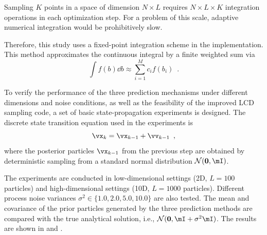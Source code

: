 Sampling $K$ points in a space of dimension $N \times L$ requires $N \times L \times K$ integration operations in each optimization step. For a problem of this scale, adaptive numerical integration would be prohibitively slow.

Therefore, this study uses a fixed-point integration scheme in the implementation. This method approximates the continuous integral by a finite weighted sum via
\begin{equation}
	\int f(b) \dd b \approx \sum_{i=1}^M c_i f(b_i) \enspace .
\end{equation}

To verify the performance of the three prediction mechanisms under different dimensions and noise conditions, as well as the feasibility of the improved LCD sampling code, a set of basic state-propagation experiments is designed. The discrete state transition equation used in the experiments is
\begin{equation}
	\vx_k = \vx_{k-1} + \vv_{k-1} \enspace ,
\end{equation}
where the posterior particles $\vx_{k-1}$ from the previous step are obtained by deterministic sampling from a standard normal distribution $\mathcal{N}(\mathbf{0}, \mI)$.

The experiments are conducted in low-dimensional settings (2D, $L=100$ particles) and high-dimensional settings (10D, $L=1000$ particles). Different process noise variances $\sigma^2 \in \{1.0, 2.0, 5.0, 10.0\}$ are also tested. The mean and covariance of the prior particles generated by the three prediction methods are compared with the true analytical solution, i.e., $\mathcal{N}(\mathbf{0}, \mI + \sigma^2\mI)$. The results are shown in  and .

